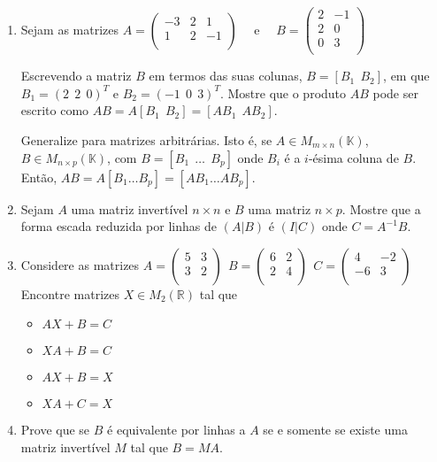 \documentclass{article}
\theoremstyle{plain}
\theoremstyle{obs}
\numberwithin{equation}{section}
\begin{document}
\begin{enumerate}
   \item Sejam as matrizes 
       $
       A=
       \begin{pmatrix}
       -3 & 2 & 1 \\
        1 & 2 &-1 \\
       \end{pmatrix}
       $
       \ \ e 
       \ \
       $
       B=
       \begin{pmatrix}
       2 &-1 \\
       2 & 0 \\
       0 & 3 \\
       \end{pmatrix}
       $
       
   Escrevendo a matriz $B$ em termos das suas colunas, 
   $B=[B_{1} \ \ B_2]$, em que 
   $B_{1}=(2 \ \ 2 \ \ 0)^{T}$
   e $B_2=(-1 \ \ 0 \ \ 3)^{T}$. Mostre que o produto $AB$ pode ser escrito como 
   $AB=A[B_1 \ \ B_2]=[AB_1 \ \ AB_2]$. 
   
   Generalize para matrizes arbitrárias.
   Isto é, se $A \in M_{m\times n}(\mathbb{K})$, 
   $B \in M_{n \times p}(\mathbb{K})$, com $B=[B_1 \ \ \dots \ \ B_{p}]$
   onde $B_{i}$ é a $i$-ésima coluna de $B$. Então, 
   $AB=A[B_1 \dots B_p]=[AB_1 \dots AB_p]$.
    \item Sejam $A$ uma matriz invertível $n\times n$
 e $B$ uma matriz $n\times p$. Mostre que a forma escada reduzida por linhas 
 de $(A|B)$ é $(I|C)$ onde $C=A^{-1}B$.
   
   \item Considere as matrizes 
        $
       A=
       \begin{pmatrix}
       5 & 3 \\
       3 & 2 \\
       \end{pmatrix}
       \ \ 
       B=
       \begin{pmatrix}
       6 & 2 \\
       2 & 4 \\
       \end{pmatrix}
       \ \ 
       C=
       \begin{pmatrix}
       4 & -2 \\
       -6 & 3 \\
       \end{pmatrix}
       $
   Encontre matrizes $X \in M_{2}(\mathbb{R})$ tal que 
     \begin{itemize}
     \item $AX+B=C$
     \item $XA+B=C$
     \item $AX+B=X$
     \item $XA+C=X$
     \end{itemize}
 \item Prove que se $B$ é equivalente por linhas a $A$
 se e somente se existe uma matriz invertível $M$
 tal que $B=MA$.
    

\end{enumerate}
\end{document}
